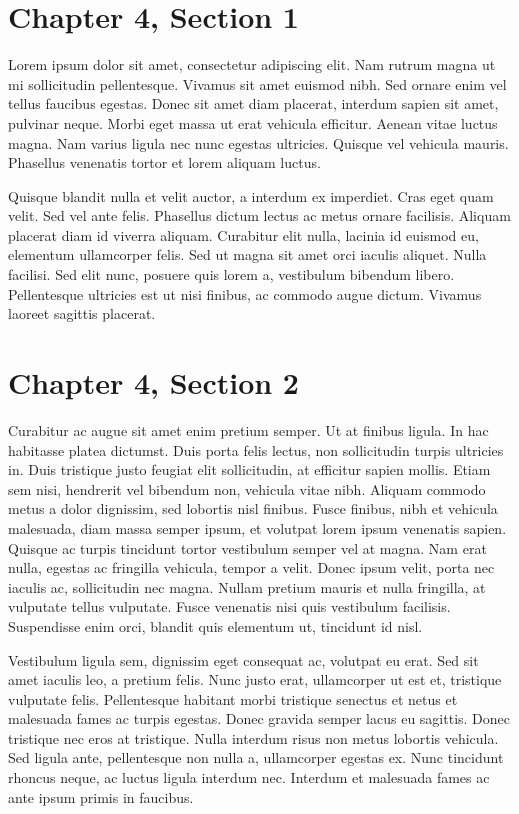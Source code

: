 \section{Chapter 4, Section 1}

Lorem ipsum dolor sit amet, consectetur adipiscing elit. Nam rutrum magna ut mi sollicitudin pellentesque. Vivamus sit amet euismod nibh. Sed ornare enim vel tellus faucibus egestas. Donec sit amet diam placerat, interdum sapien sit amet, pulvinar neque. Morbi eget massa ut erat vehicula efficitur. Aenean vitae luctus magna. Nam varius ligula nec nunc egestas ultricies. Quisque vel vehicula mauris. Phasellus venenatis tortor et lorem aliquam luctus.

Quisque blandit nulla et velit auctor, a interdum ex imperdiet. Cras eget quam velit. Sed vel ante felis. Phasellus dictum lectus ac metus ornare facilisis. Aliquam placerat diam id viverra aliquam. Curabitur elit nulla, lacinia id euismod eu, elementum ullamcorper felis. Sed ut magna sit amet orci iaculis aliquet. Nulla facilisi. Sed elit nunc, posuere quis lorem a, vestibulum bibendum libero. Pellentesque ultricies est ut nisi finibus, ac commodo augue dictum. Vivamus laoreet sagittis placerat.

\section{Chapter 4, Section 2}

Curabitur ac augue sit amet enim pretium semper. Ut at finibus ligula. In hac habitasse platea dictumst. Duis porta felis lectus, non sollicitudin turpis ultricies in. Duis tristique justo feugiat elit sollicitudin, at efficitur sapien mollis. Etiam sem nisi, hendrerit vel bibendum non, vehicula vitae nibh. Aliquam commodo metus a dolor dignissim, sed lobortis nisl finibus. Fusce finibus, nibh et vehicula malesuada, diam massa semper ipsum, et volutpat lorem ipsum venenatis sapien. Quisque ac turpis tincidunt tortor vestibulum semper vel at magna. Nam erat nulla, egestas ac fringilla vehicula, tempor a velit. Donec ipsum velit, porta nec iaculis ac, sollicitudin nec magna. Nullam pretium mauris et nulla fringilla, at vulputate tellus vulputate. Fusce venenatis nisi quis vestibulum facilisis. Suspendisse enim orci, blandit quis elementum ut, tincidunt id nisl.

Vestibulum ligula sem, dignissim eget consequat ac, volutpat eu erat. Sed sit amet iaculis leo, a pretium felis. Nunc justo erat, ullamcorper ut est et, tristique vulputate felis. Pellentesque habitant morbi tristique senectus et netus et malesuada fames ac turpis egestas. Donec gravida semper lacus eu sagittis. Donec tristique nec eros at tristique. Nulla interdum risus non metus lobortis vehicula. Sed ligula ante, pellentesque non nulla a, ullamcorper egestas ex. Nunc tincidunt rhoncus neque, ac luctus ligula interdum nec. Interdum et malesuada fames ac ante ipsum primis in faucibus.

